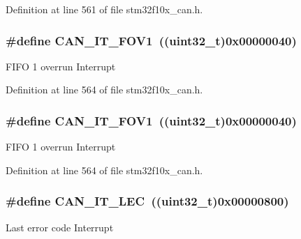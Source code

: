 Definition at line 561 of file stm32f10x\+\_\+can.\+h.

\subsubsection[{\texorpdfstring{C\+A\+N\+\_\+\+I\+T\+\_\+\+F\+O\+V1}{CAN_IT_FOV1}}]{\setlength{\rightskip}{0pt plus 5cm}\#define C\+A\+N\+\_\+\+I\+T\+\_\+\+F\+O\+V1~(({\bf uint32\+\_\+t})0x00000040)}\hypertarget{group___c_a_n__interrupts_ga963301fdbede5f9a9665dc5b6210eaec}{}\label{group___c_a_n__interrupts_ga963301fdbede5f9a9665dc5b6210eaec}
F\+I\+FO 1 overrun Interrupt 

Definition at line 564 of file stm32f10x\+\_\+can.\+h.

\subsubsection[{\texorpdfstring{C\+A\+N\+\_\+\+I\+T\+\_\+\+F\+O\+V1}{CAN_IT_FOV1}}]{\setlength{\rightskip}{0pt plus 5cm}\#define C\+A\+N\+\_\+\+I\+T\+\_\+\+F\+O\+V1~(({\bf uint32\+\_\+t})0x00000040)}\hypertarget{group___c_a_n__interrupts_ga963301fdbede5f9a9665dc5b6210eaec}{}\label{group___c_a_n__interrupts_ga963301fdbede5f9a9665dc5b6210eaec}
F\+I\+FO 1 overrun Interrupt 

Definition at line 564 of file stm32f10x\+\_\+can.\+h.

\subsubsection[{\texorpdfstring{C\+A\+N\+\_\+\+I\+T\+\_\+\+L\+EC}{CAN_IT_LEC}}]{\setlength{\rightskip}{0pt plus 5cm}\#define C\+A\+N\+\_\+\+I\+T\+\_\+\+L\+EC~(({\bf uint32\+\_\+t})0x00000800)}\hypertarget{group___c_a_n__interrupts_gad670b6f001bf67f24e17d91ada50a61c}{}\label{group___c_a_n__interrupts_gad670b6f001bf67f24e17d91ada50a61c}
Last error code Interrupt 


